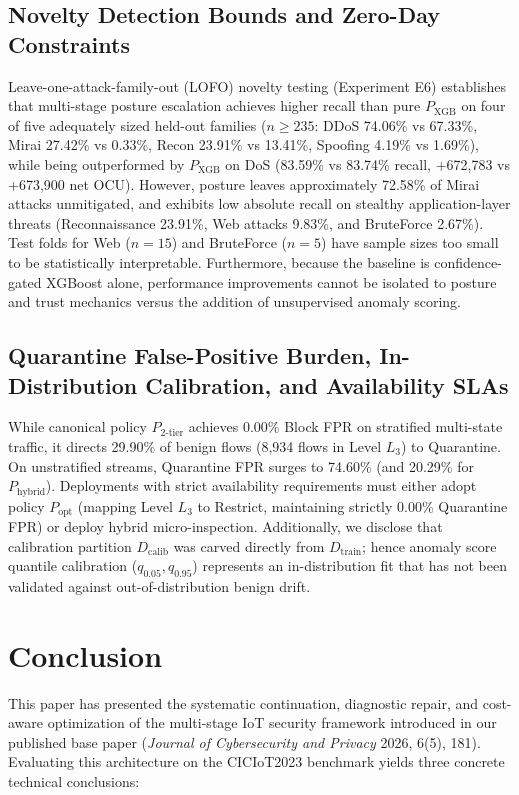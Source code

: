 \documentclass[journal,10pt,onecolumn]{IEEEtran}
\begin{document}
\subsection{Novelty Detection Bounds and Zero-Day Constraints}
Leave-one-attack-family-out (LOFO) novelty testing (Experiment E6) establishes that multi-stage posture escalation achieves higher recall than pure $P_{\text{XGB}}$ on four of five adequately sized held-out families ($n \ge 235$: DDoS 74.06\% vs 67.33\%, Mirai 27.42\% vs 0.33\%, Recon 23.91\% vs 13.41\%, Spoofing 4.19\% vs 1.69\%), while being outperformed by $P_{\text{XGB}}$ on DoS (83.59\% vs 83.74\% recall, +672,783 vs +673,900 net OCU). However, posture leaves approximately 72.58\% of Mirai attacks unmitigated, and exhibits low absolute recall on stealthy application-layer threats (Reconnaissance 23.91\%, Web attacks 9.83\%, and BruteForce 2.67\%). Test folds for Web ($n=15$) and BruteForce ($n=5$) have sample sizes too small to be statistically interpretable. Furthermore, because the baseline is confidence-gated XGBoost alone, performance improvements cannot be isolated to posture and trust mechanics versus the addition of unsupervised anomaly scoring.

\subsection{Quarantine False-Positive Burden, In-Distribution Calibration, and Availability SLAs}
While canonical policy $P_{2\text{-tier}}$ achieves 0.00\% Block FPR on stratified multi-state traffic, it directs 29.90\% of benign flows (8,934 flows in Level $L_3$) to Quarantine. On unstratified streams, Quarantine FPR surges to 74.60\% (and 20.29\% for $P_{\text{hybrid}}$). Deployments with strict availability requirements must either adopt policy $P_{\text{opt}}$ (mapping Level $L_3$ to Restrict, maintaining strictly 0.00\% Quarantine FPR) or deploy hybrid micro-inspection. Additionally, we disclose that calibration partition $D_{\text{calib}}$ was carved directly from $D_{\text{train}}$; hence anomaly score quantile calibration ($q_{0.05}, q_{0.95}$) represents an in-distribution fit that has not been validated against out-of-distribution benign drift.

\section{Conclusion}

This paper has presented the systematic continuation, diagnostic repair, and cost-aware optimization of the multi-stage IoT security framework introduced in our published base paper \cite{1} (\textit{Journal of Cybersecurity and Privacy} 2026, 6(5), 181). Evaluating this architecture on the CICIoT2023 benchmark yields three concrete technical conclusions:
\end{document}
